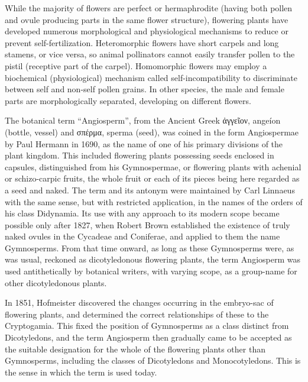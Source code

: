 While the majority of flowers are perfect or hermaphrodite (having both pollen and ovule producing parts in the same flower structure), flowering plants have developed numerous morphological and physiological mechanisms to reduce or prevent self-fertilization. Heteromorphic flowers have short carpels and long stamens, or vice versa, so animal pollinators cannot easily transfer pollen to the pistil (receptive part of the carpel). Homomorphic flowers may employ a biochemical (physiological) mechanism called self-incompatibility to discriminate between self and non-self pollen grains. In other species, the male and female parts are morphologically separated, developing on different flowers.

The botanical term ``Angiosperm'', from the Ancient Greek ἀγγεῖον, angeíon (bottle, vessel) and σπέρμα, sperma (seed), was coined in the form Angiospermae by Paul Hermann in 1690, as the name of one of his primary divisions of the plant kingdom. This included flowering plants possessing seeds enclosed in capsules, distinguished from his Gymnospermae, or flowering plants with achenial or schizo-carpic fruits, the whole fruit or each of its pieces being here regarded as a seed and naked. The term and its antonym were maintained by Carl Linnaeus with the same sense, but with restricted application, in the names of the orders of his class Didynamia. Its use with any approach to its modern scope became possible only after 1827, when Robert Brown established the existence of truly naked ovules in the Cycadeae and Coniferae, and applied to them the name Gymnosperms. From that time onward, as long as these Gymnosperms were, as was usual, reckoned as dicotyledonous flowering plants, the term Angiosperm was used antithetically by botanical writers, with varying scope, as a group-name for other dicotyledonous plants.

In 1851, Hofmeister discovered the changes occurring in the embryo-sac of flowering plants, and determined the correct relationships of these to the Cryptogamia. This fixed the position of Gymnosperms as a class distinct from Dicotyledons, and the term Angiosperm then gradually came to be accepted as the suitable designation for the whole of the flowering plants other than Gymnosperms, including the classes of Dicotyledons and Monocotyledons. This is the sense in which the term is used today.

